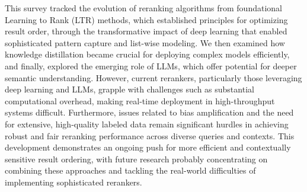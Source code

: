 \documentclass[runningheads]{llncs}
\begin{document}
This survey tracked the evolution of reranking algorithms from foundational Learning to Rank (LTR) methods, which established principles for optimizing result order, through the transformative impact of deep learning that enabled sophisticated pattern capture and list-wise modeling. We then examined how knowledge distillation became crucial for deploying complex models efficiently, and finally, explored the emerging role of LLMs, which offer potential for deeper semantic understanding. However, current rerankers, particularly those leveraging deep learning and LLMs, grapple with challenges such as substantial computational overhead, making real-time deployment in high-throughput systems difficult. Furthermore, issues related to bias amplification and the need for extensive, high-quality labeled data remain significant hurdles in achieving robust and fair reranking performance across diverse queries and contexts. This development demonstrates an ongoing push for more efficient and contextually sensitive result ordering, with future research probably concentrating on combining these approaches and tackling the real-world difficulties of implementing sophisticated rerankers.

%
%
%
% 
% 
\printbibliography
%




\end{document}
